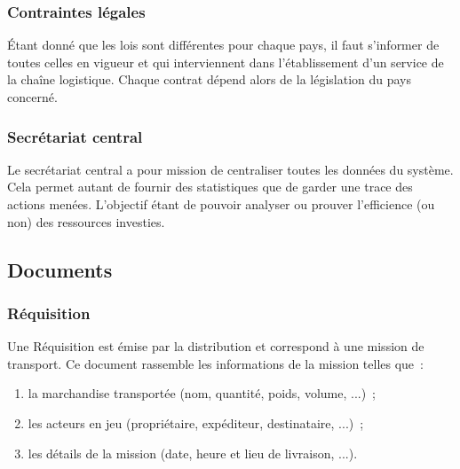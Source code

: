 \documentclass[11pt,fleqn]{report}
\begin{document}
\subsubsection{Contraintes légales}
Étant donné que les lois sont différentes pour chaque pays, il faut s'informer de toutes celles en vigueur et qui interviennent dans l'établissement d'un service de la chaîne logistique. Chaque contrat dépend alors de la législation du pays concerné.

\subsubsection{Secrétariat central}
Le secrétariat central a pour mission de centraliser toutes les données du système. Cela permet autant de fournir des statistiques que de garder une trace des actions menées. L'objectif étant de pouvoir analyser ou prouver l'efficience (ou non) des ressources investies.

\subsection{Documents}

\subsubsection{Réquisition}
Une Réquisition est émise par la distribution et correspond à une mission de transport. Ce document rassemble les informations de la mission telles que~:
\begin{enumerate}
	\item la marchandise transportée (nom, quantité, poids, volume, ...)~;
	\item les acteurs en jeu (propriétaire, expéditeur, destinataire, ...)~;
	\item les détails de la mission (date, heure et lieu de livraison, ...).
\end{enumerate}
\end{document}

